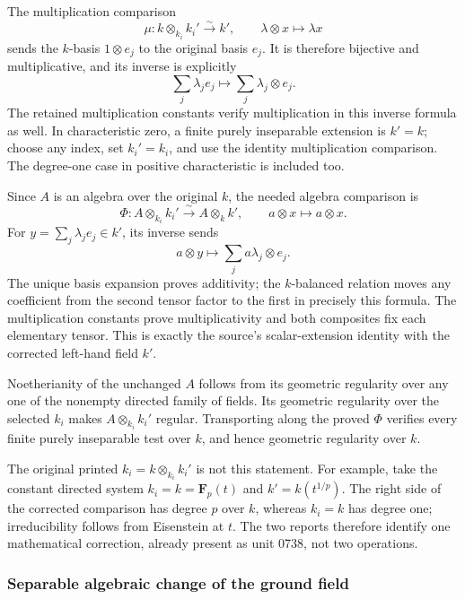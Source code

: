 The multiplication comparison \[
 \mu:k\otimes_{k_i}k_i'\xrightarrow{\sim}k',\qquad
 \lambda\otimes x\longmapsto\lambda x
\] sends the \(k\)-basis \(1\otimes e_j\) to the original basis \(e_j\). It is therefore bijective and multiplicative, and its inverse is explicitly \[
 \sum_j\lambda_je_j\longmapsto\sum_j\lambda_j\otimes e_j.
\] The retained multiplication constants verify multiplication in this inverse formula as well. In characteristic zero, a finite purely inseparable extension is \(k'=k\); choose any index, set \(k_i'=k_i\), and use the identity multiplication comparison. The degree-one case in positive characteristic is included too.

Since \(A\) is an algebra over the original \(k\), the needed algebra comparison is \[
 \Phi:A\otimes_{k_i}k_i'\xrightarrow{\sim}A\otimes_kk',
 \qquad a\otimes x\longmapsto a\otimes x.
\] For \(y=\sum_j\lambda_je_j\in k'\), its inverse sends \[
 a\otimes y\longmapsto\sum_j a\lambda_j\otimes e_j.
\] The unique basis expansion proves additivity; the \(k\)-balanced relation moves any coefficient from the second tensor factor to the first in precisely this formula. The multiplication constants prove multiplicativity and both composites fix each elementary tensor. This is exactly the source's scalar-extension identity with the corrected left-hand field \(k'\).

Noetherianity of the unchanged \(A\) follows from its geometric regularity over any one of the nonempty directed family of fields. Its geometric regularity over the selected \(k_i\) makes \(A\otimes_{k_i}k_i'\) regular. Transporting along the proved \(\Phi\) verifies every finite purely inseparable test over \(k\), and hence geometric regularity over \(k\).

The original printed \(k_i=k\otimes_{k_i}k_i'\) is not this statement. For example, take the constant directed system \(k_i=k=\mathbf F_p(t)\) and \(k'=k(t^{1/p})\). The right side of the corrected comparison has degree \(p\) over \(k\), whereas \(k_i=k\) has degree one; irreducibility follows from Eisenstein at \(t\). The two reports therefore identify one mathematical correction, already present as unit 0738, not two operations.

\subsubsection{Separable algebraic change of the ground field}\label{algebra-proof-071-separable-algebraic-change-of-the-ground-field}

